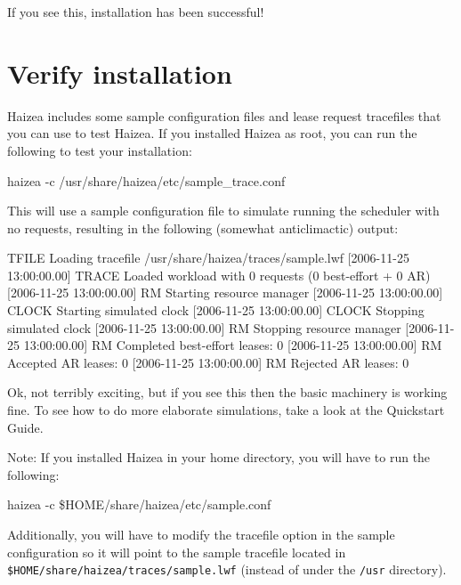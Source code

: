 If you see this, installation has been successful!

\section{Verify installation}

Haizea includes some sample configuration files and lease request tracefiles that you can use to test Haizea. If you installed Haizea as root, you can run the following to test your installation:

\begin{shellverbatim}
haizea -c /usr/share/haizea/etc/sample_trace.conf
\end{shellverbatim}

This will use a sample configuration file to simulate running the scheduler with no requests, resulting in the following (somewhat anticlimactic) output:

\begin{wideshellverbatim}
[2006-11-25 13:00:00.00] TFILE   Loading tracefile /usr/share/haizea/traces/sample.lwf
[2006-11-25 13:00:00.00] TRACE   Loaded workload with 0 requests (0 best-effort + 0 AR)
[2006-11-25 13:00:00.00] RM      Starting resource manager
[2006-11-25 13:00:00.00] CLOCK   Starting simulated clock
[2006-11-25 13:00:00.00] CLOCK   Stopping simulated clock
[2006-11-25 13:00:00.00] RM      Stopping resource manager
[2006-11-25 13:00:00.00] RM        Completed best-effort leases: 0
[2006-11-25 13:00:00.00] RM        Accepted AR leases: 0
[2006-11-25 13:00:00.00] RM        Rejected AR leases: 0
\end{wideshellverbatim}

Ok, not terribly exciting, but if you see this then the basic machinery is working fine. To see how to do more elaborate simulations, take a look at the Quickstart Guide.

Note: If you installed Haizea in your home directory, you will have to run the following:

\begin{shellverbatim}
haizea -c \$HOME/share/haizea/etc/sample.conf
\end{shellverbatim}

Additionally, you will have to modify the tracefile option in the sample configuration so it will point to the sample tracefile located in \texttt{\$HOME/share/haizea/traces/sample.lwf} (instead of under the \texttt{/usr} directory).